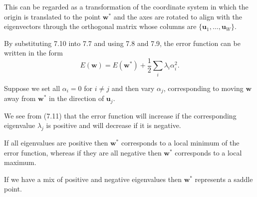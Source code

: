\documentclass{article}
\begin{document}
This can be regarded as a transformation of the coordinate system in which the origin is translated to the point $\mathbf{w}^*$ and the axes are rotated to align with the eigenvectors through the orthogonal matrix whose columns are $\{\mathbf{u}_1,\dots,\mathbf{u}_W\}$. 

By substituting {7.10} into {7.7} and using {7.8} and {7.9}, the error function can be written in the form
\begin{equation}
E(\mathbf{w}) = E(\mathbf{w}^*) + \frac{1}{2} \sum_i \lambda_i \alpha_i^2.
\tag{7.11}
\end{equation}

Suppose we set all $\alpha_i = 0$ for $i \ne j$ and then vary $\alpha_j$, corresponding to moving $\mathbf{w}$ away from $\mathbf{w}^*$ in the direction of $\mathbf{u}_j$. 

We see from {(7.11)} that the error function will increase if the corresponding eigenvalue $\lambda_j$ is positive and will decrease if it is negative. 

If all eigenvalues are positive then $\mathbf{w}^*$ corresponds to a local minimum of the error function, whereas if they are all negative then $\mathbf{w}^*$ corresponds to a local maximum. 

If we have a mix of positive and negative eigenvalues then $\mathbf{w}^*$ represents a saddle point.
\end{document}
